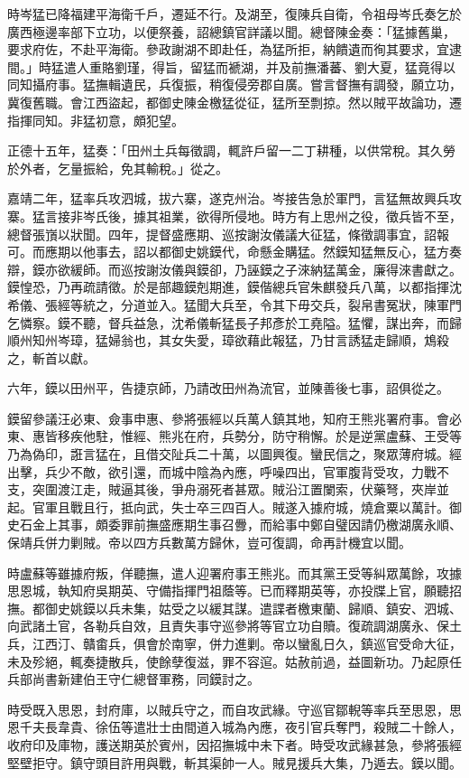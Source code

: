 \begin{pinyinscope}
時岑猛已降福建平海衛千戶，遷延不行。及湖至，復陳兵自衛，令祖母岑氏奏乞於廣西極邊率部下立功，以便祭養，詔總鎮官詳議以聞。總督陳金奏：「猛據舊巢，要求府佐，不赴平海衛。參政謝湖不即赴任，為猛所拒，納饋遺而徇其要求，宜逮間。」時猛遣人重賂劉瑾，得旨，留猛而褫湖，并及前撫潘蕃、劉大夏，猛竟得以同知攝府事。猛撫輯遺民，兵復振，稍復侵旁郡自廣。嘗言督撫有調發，願立功，冀復舊職。會江西盜起，都御史陳金檄猛從征，猛所至剽掠。然以賊平故論功，遷指揮同知。非猛初意，頗犯望。

正德十五年，猛奏：「田州土兵每徵調，輒許戶留一二丁耕種，以供常稅。其久勞於外者，乞量振給，免其輸稅。」從之。

嘉靖二年，猛率兵攻泗城，拔六寨，遂克州治。岑接告急於軍門，言猛無故興兵攻寨。猛言接非岑氏後，據其祖業，欲得所侵地。時方有上思州之役，徵兵皆不至，總督張嵿以狀聞。四年，提督盛應期、巡按謝汝儀議大征猛，條徵調事宜，詔報可。而應期以他事去，詔以都御史姚鏌代，命懸金購猛。然鏌知猛無反心，猛方奏辯，鏌亦欲緩師。而巡按謝汝儀與鏌卻，乃誣鏌之子淶納猛萬金，廉得淶書獻之。鏌惶恐，乃再疏請徵。於是部趣鏌剋期進，鏌偕總兵官朱麒發兵八萬，以都指揮沈希儀、張經等統之，分道並入。猛聞大兵至，令其下毋交兵，裂帛書冤狀，陳軍門乞憐察。鏌不聽，督兵益急，沈希儀斬猛長子邦彥於工堯隘。猛懼，謀出奔，而歸順州知州岑璋，猛婦翁也，其女失愛，璋欲藉此報猛，乃甘言誘猛走歸順，鴆殺之，斬首以獻。

六年，鏌以田州平，告捷京師，乃請改田州為流官，並陳善後七事，詔俱從之。

鏌留參議汪必東、僉事申惠、參將張經以兵萬人鎮其地，知府王熊兆署府事。會必東、惠皆移疾他駐，惟經、熊兆在府，兵勢分，防守稍懈。於是逆黨盧蘇、王受等乃為偽印，誑言猛在，且借交阯兵二十萬，以圖興復。蠻民信之，聚眾薄府城。經出擊，兵少不敵，欲引還，而城中陰為內應，呼噪四出，官軍腹背受攻，力戰不支，突圍渡江走，賊逼其後，爭舟溺死者甚眾。賊沿江置闌索，伏藥弩，夾岸並起。官軍且戰且行，抵向武，失士卒三四百人。賊遂入據府城，燒倉粟以萬計。御史石金上其事，頗委罪前撫盛應期生事召釁，而給事中鄭自璧因請仍檄湖廣永順、保靖兵併力剿賊。帝以四方兵數萬方歸休，豈可復調，命再計機宜以聞。

時盧蘇等雖據府叛，佯聽撫，遣人迎署府事王熊兆。而其黨王受等糾眾萬餘，攻據思恩城，執知府吳期英、守備指揮門祖蔭等。已而釋期英等，亦投牒上官，願聽招撫。都御史姚鏌以兵未集，姑受之以緩其謀。遣諜者檄東蘭、歸順、鎮安、泗城、向武諸土官，各勒兵自效，且責失事守巡參將等官立功自贖。復疏調湖廣永、保土兵，江西汀、贛畬兵，俱會於南寧，併力進剿。帝以蠻亂日久，鎮巡官受命大征，未及殄絕，輒奏捷散兵，使餘孽復滋，罪不容逭。姑赦前過，益圖新功。乃起原任兵部尚書新建伯王守仁總督軍務，同鏌討之。

時受既入思恩，封府庫，以賊兵守之，而自攻武緣。守巡官鄒輗等率兵至思恩，思恩千夫長韋貴、徐伍等遣壯士由間道入城為內應，夜引官兵奪門，殺賊二十餘人，收府印及庫物，護送期英於賓州，因招撫城中未下者。時受攻武緣甚急，參將張經堅壁拒守。鎮守頭目許用與戰，斬其渠帥一人。賊見援兵大集，乃遁去。鏌以聞。


\end{pinyinscope}
